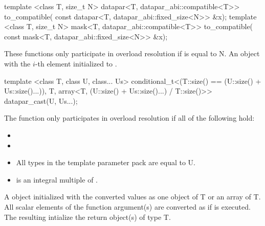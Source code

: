 \begin{itemdecl}
template <class T, size_t N>
datapar<T, datapar_abi::compatible<T>> to_compatible(
    const datapar<T, datapar_abi::fixed_size<N>> &x);
template <class T, size_t N>
mask<T, datapar_abi::compatible<T>> to_compatible(
    const mask<T, datapar_abi::fixed_size<N>> &x);
\end{itemdecl}
\begin{itemdescr}
  \pnum\remarks These functions only participate in overload resolution if  is equal to \code N.
  \pnum\returns An object with the $i$-th element initialized to .
\end{itemdescr}

\begin{itemdecl}
template <class T, class U, class... Us>
conditional_t<(T::size() == (U::size() + Us::size()...)), T,
            array<T, (U::size() + Us::size()...) / T::size()>> datapar_cast(U, Us...);
\end{itemdecl}
\begin{itemdescr}
  \pnum\remarks The  function only participates in overload resolution if all of the following hold:
  \begin{itemize}
    \item {}
    \item {}
    \item All types in the template parameter pack  are equal to \type U.
    \item {} is an integral multiple of .
  \end{itemize}

  \pnum\returns A \datapar object initialized with the converted values as one object of \type T or an array of \type T.
  All scalar elements  of the function argument(s) are converted as if
   is executed.
  The resulting  intialize the return object(s) of type \type T.
\end{itemdescr}

